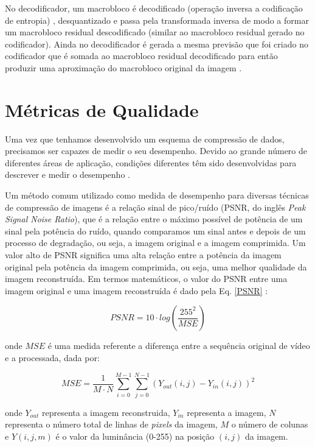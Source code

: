 No decodificador, um macrobloco é decodificado (operação inversa a codificação de entropia) , desquantizado e passa pela transformada inversa de modo a formar um macrobloco residual descodificado (similar ao macrobloco residual gerado no codificador). Ainda no decodificador é gerada a mesma previsão que foi criado no codificador que é somada ao macrobloco residual decodificado para então produzir uma aproximação do macrobloco original da imagem \cite{richardson2011h}.

\section{Métricas de Qualidade}
Uma vez que tenhamos desenvolvido um esquema de compressão de dados, precisamos ser capazes de medir o seu desempenho. Devido ao grande número de diferentes áreas de aplicação, condições diferentes têm sido desenvolvidas para descrever e medir o desempenho \cite{sayood2012introduction}.

Um método comum utilizado como medida de desempenho para diversas técnicas de compressão de imagens é a relação sinal de pico/ruído (PSNR, do inglês \textit{Peak Signal Noise Ratio}), que é a relação entre o máximo possível de potência de um sinal pela potência do ruído, quando comparamos um sinal antes e depois de um
processo de degradação, ou seja, a imagem original e a imagem comprimida. Um valor alto de PSNR significa uma alta relação entre a potência da imagem original pela potência da imagem comprimida, ou seja, uma melhor qualidade da imagem reconstruída. Em termos matemáticos, o valor do PSNR entre uma imagem original  e uma imagem reconstruída é dado pela Eq. \ref{PSNR} \cite{vergutz2013combinaccao} : 
\vspace{-3mm}
\begin{center}
	\begin{equation}
		\label{PSNR}
		PSNR = 10\cdot log\left(\displaystyle\frac{255^2}{MSE}\right)
	\end{equation}
\end{center}

\noindent onde $MSE$ é uma medida referente a diferença entre a sequência original de vídeo e a processada, dada por:
\vspace{-5mm}
\begin{center}
	\begin{equation}
		MSE = \displaystyle\frac{1}{M\cdot N}\sum_{i=0}^{M-1}\sum_{j=0}^{N-1} (Y_{out}(i,j) - Y_{in}(i,j))^2 
	\end{equation}
\end{center} 	
onde $Y_{out}$ representa a imagem reconstruida, $Y_{in}$ representa a imagem, $N$ representa o número total de linhas de \textit{pixels} da imagem, $M$ o número de colunas  e $Y(i,j,m)$ é o valor  da luminância (0-255) na posição $(i,j)$ da imagem.

